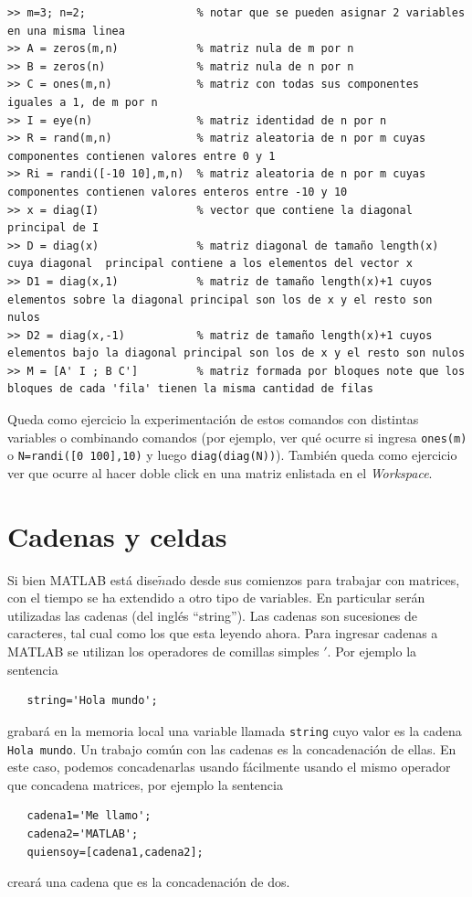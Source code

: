 \documentclass[letter,11pt]{article}
\newcommand\0{\mathbf{0}}
\begin{document}
\begin{lstlisting}
>> m=3; n=2;                 % notar que se pueden asignar 2 variables en una misma linea
>> A = zeros(m,n)            % matriz nula de m por n
>> B = zeros(n)              % matriz nula de n por n
>> C = ones(m,n)             % matriz con todas sus componentes  iguales a 1, de m por n
>> I = eye(n)                % matriz identidad de n por n
>> R = rand(m,n)             % matriz aleatoria de n por m cuyas componentes contienen valores entre 0 y 1                                    
>> Ri = randi([-10 10],m,n)  % matriz aleatoria de n por m cuyas componentes contienen valores enteros entre -10 y 10
>> x = diag(I)               % vector que contiene la diagonal principal de I
>> D = diag(x)               % matriz diagonal de tamaño length(x) cuya diagonal  principal contiene a los elementos del vector x
>> D1 = diag(x,1)            % matriz de tamaño length(x)+1 cuyos elementos sobre la diagonal principal son los de x y el resto son nulos
>> D2 = diag(x,-1)           % matriz de tamaño length(x)+1 cuyos elementos bajo la diagonal principal son los de x y el resto son nulos
>> M = [A' I ; B C']         % matriz formada por bloques note que los bloques de cada 'fila' tienen la misma cantidad de filas
\end{lstlisting}

\medskip

Queda como ejercicio la experimentaci\'on de estos comandos con distintas variables o combinando comandos (por ejemplo, ver qu\'e ocurre si ingresa \verb"ones(m)" o \verb"N=randi([0 100],10)" y luego \verb"diag(diag(N))"). Tambi\'en queda como ejercicio ver que ocurre al hacer doble click en una matriz enlistada en el \emph{Workspace}. 

\section{Cadenas y celdas}
  Si bien MATLAB est\'a dise$\tilde{n}$ado desde sus comienzos para trabajar con matrices, con el tiempo se ha extendido a otro tipo de variables. En particular ser\'an utilizadas las cadenas (del ingl\'es ``string''). Las cadenas son sucesiones de caracteres, tal cual como los que esta leyendo ahora. Para ingresar cadenas a MATLAB se utilizan los operadores de comillas simples $'$. Por ejemplo la sentencia
  \begin{lstlisting}
   string='Hola mundo';
  \end{lstlisting}
  grabar\'a en la memoria local una variable llamada \texttt{string} cuyo valor es la cadena \texttt{Hola mundo}. Un trabajo com\'un con las cadenas es la concadenaci\'on de ellas. En este caso, podemos concadenarlas usando f\'acilmente usando el mismo operador que concadena matrices, por ejemplo la sentencia
  \begin{lstlisting}
   cadena1='Me llamo';
   cadena2='MATLAB';
   quiensoy=[cadena1,cadena2];
  \end{lstlisting}
  crear\'a una cadena que es la concadenaci\'on de dos.
  
\end{document}
